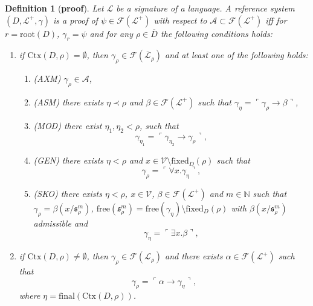 \documentclass[10pt]{article}
\theoremstyle{plain}
\newtheorem{definition}[theorem]{Definition}
\newcommand{\free}{\text{free}}
\newcommand{\sk}{\mathfrak{s}}
\newcommand{\N}{\mathbb{N}}
\newcommand{\F}{\mathcal{F}}
\renewcommand{\root}{\text{root}}
\newcommand{\final}{\text{final}}
\newcommand{\context}{\text{Ctx}}
\renewcommand{\L}{\mathscr{L}}
\newcommand{\V}{\mathscr{V}}
\newcommand{\fixed}{\text{fixed}}
\begin{document}
\begin{definition}[\textbf{proof}]
\label{proof-definition}
Let $\L$ be a signature of a language.
A reference system $(D, \L^+, \gamma)$ is a proof of $\psi\in\F(\L^+)$ with respect to $\mathcal{A}\subset \F(\L^+)$ iff for $r = \root(D)$, $\gamma_r = \psi$
and for any $\rho\in \overline{D}$ the following conditions holds:
\begin{enumerate}
\item \label{shallow-part} if $\context(D, \rho) = \emptyset$, then $\gamma_\rho\in\F(\overline{\L}_\rho)$ and at least one of the following holds:
\begin{enumerate}
\item (AXM) $\gamma_\rho\in \mathcal{A}$,
\item (ASM) there exists $\eta \prec \rho$ and $\beta\in \F(\L^+)$
such that $\gamma_\eta = \ulcorner \gamma_\rho \to \beta \urcorner$,
\item (MOD) there exist $\eta_1, \eta_2 < \rho$, such that
\begin{equation}
\gamma_{\eta_1} = \ulcorner \gamma_{\eta_2} \to \gamma_\rho \urcorner,
\end{equation}
\item \label{gen-part} (GEN) there exists $\eta < \rho$ and $x\in \V\setminus  \fixed_D(\rho)$ such that
\begin{equation}
\gamma_\rho = \ulcorner \forall x. \gamma_\eta \urcorner,
\end{equation}
\item \label{sko-part}(SKO) there exists $\eta < \rho$, $x\in \V$, $\beta\in \F(\L^+)$ and $m\in\N$ such that
$\gamma_\rho = \beta(x/\sk^m_\rho)$, 
$\free(\sk^m_\rho) = \free(\gamma_\eta) \setminus \fixed_D(\rho)$ with $\beta(x/\sk^m_\rho)$ admissible and
\begin{equation}
\gamma_\eta = \ulcorner \exists x. \beta\urcorner, 
\end{equation}
\end{enumerate}
\item if $\context(D, \rho) \not= \emptyset$, then $\gamma_\rho\in \F(\L_\rho)$ and there exists $\alpha\in\F(\L^+)$
 such that
\begin{equation}
\gamma_\rho = \ulcorner \alpha \to \gamma_\eta \urcorner,
\end{equation}
where $\eta = \final(\context(D, \rho))$.
\end{enumerate}
\end{definition}
\end{document}

